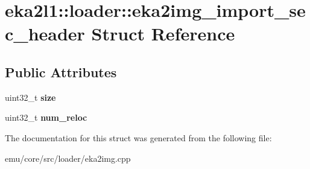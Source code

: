 \hypertarget{structeka2l1_1_1loader_1_1eka2img__import__sec__header}{}\section{eka2l1\+:\+:loader\+:\+:eka2img\+\_\+import\+\_\+sec\+\_\+header Struct Reference}
\label{structeka2l1_1_1loader_1_1eka2img__import__sec__header}
\subsection*{Public Attributes}
\begin{DoxyCompactItemize}
\item 
\mbox{\label{structeka2l1_1_1loader_1_1eka2img__import__sec__header_a4ed40ce3c25b693d6dbec928daea5b85}} 
uint32\+\_\+t {\bfseries size}
\item 
\mbox{\label{structeka2l1_1_1loader_1_1eka2img__import__sec__header_aa24c79735a4fdd39a0394c2c1b0c0723}} 
uint32\+\_\+t {\bfseries num\+\_\+reloc}
\end{DoxyCompactItemize}


The documentation for this struct was generated from the following file\+:\begin{DoxyCompactItemize}
\item 
emu/core/src/loader/eka2img.\+cpp\end{DoxyCompactItemize}
